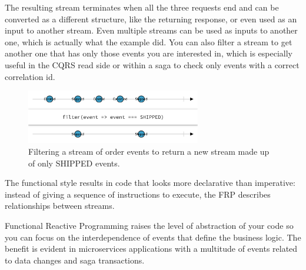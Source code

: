 \documentclass[conference]{IEEEtran}
\begin{document}
The resulting stream terminates when all the three requests end and can be converted as a different structure, like the returning response, or even used as an input to another stream. Even multiple streams can be used as inputs to another one, which is actually what the example did. You can also filter a stream to get another one that has only those events you are interested in, which is especially useful in the CQRS read side or within a saga to check only events with a correct correlation id.

\begin{figure}[!htbp]
\centering
\includegraphics[width=3in]{jpeg/rx-filter}
\caption{Filtering a stream of order events to return a new stream made up of only SHIPPED events.}
\label{rx-filter}
\end{figure}

The functional style results in code that looks more declarative than imperative: instead of giving a sequence of instructions to execute, the FRP describes relationships between streams.

Functional Reactive Programming raises the level of abstraction of your code so you can focus on the interdependence of events that define the business logic. The benefit is evident in microservices applications with a multitude of events related to data changes and saga transactions.

%
%
\end{document}
